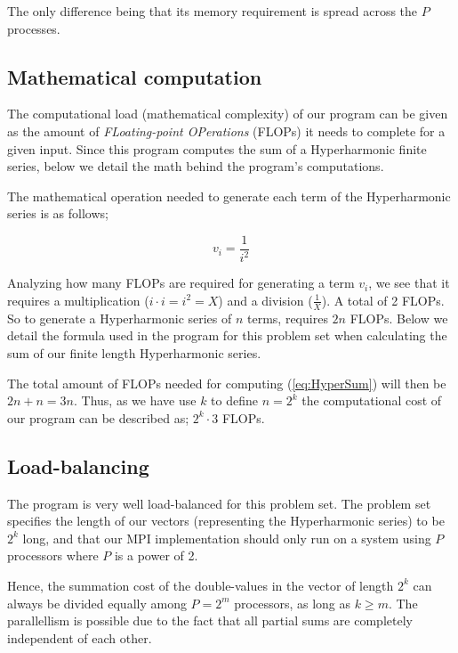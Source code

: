 \documentclass[fontsize=11pt,paper=a4,titlepage]{report}
\begin{document}
The only difference being that its memory requirement is spread across the $P$
processes.


\subsection{Mathematical computation}

The computational load (mathematical complexity) of our program can be given as
the amount of \textit{FLoating-point OPerations} (FLOPs) it needs to complete
for a given input. Since this program computes the sum of a Hyperharmonic finite
series, below we detail the math behind the program's computations.

The mathematical operation needed to generate each term of the Hyperharmonic
series is as follows;

\begin{equation}
	v_i = \frac{1}{i^2}
\end{equation}

Analyzing how many FLOPs are required for generating a term $v_i$, we see that
it requires a multiplication ($i\cdot i = i^2 = X$) and a division
($\frac{1}{X}$). A total of 2 FLOPs. So to generate a Hyperharmonic series of
$n$ terms, requires $2n$ FLOPs. Below we detail the formula used in the program
for this problem set when calculating the sum of our finite length Hyperharmonic
series.

The total amount of FLOPs needed for computing (\ref{eq:HyperSum}) will then be
$2n + n = 3n$. Thus, as we have use $k$ to define $n=2^k$ the computational cost
of our program can be described as; $2^k\cdot 3$ FLOPs.

\subsection{Load-balancing}

The program is very well load-balanced for this problem set. The problem set
specifies the length of our vectors (representing the Hyperharmonic series) to
be $2^k$ long, and that our MPI implementation should only run on a system using
$P$ processors where $P$ is a power of 2.

Hence, the summation cost of the double-values in the vector of length $2^k$ can
always be divided equally among $P = 2^m$ processors, as long as $k\geq m$. The
parallellism is possible due to the fact that all partial sums are completely
independent of each other. \newline
\end{document}
